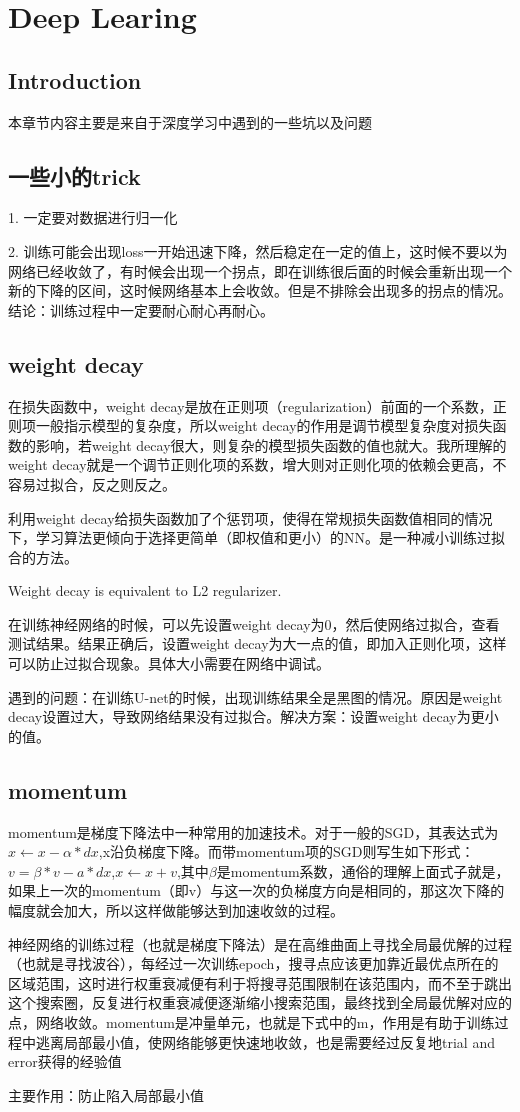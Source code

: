 \chapter{Deep Learing}

\section*{Introduction}
	本章节内容主要是来自于深度学习中遇到的一些坑以及问题
	
\section{一些小的trick}

1. 一定要对数据进行归一化

2. 训练可能会出现loss一开始迅速下降，然后稳定在一定的值上，这时候不要以为网络已经收敛了，有时候会出现一个拐点，即在训练很后面的时候会重新出现一个新的下降的区间，这时候网络基本上会收敛。但是不排除会出现多的拐点的情况。结论：训练过程中一定要耐心耐心再耐心。
	
\section{weight decay}
	\boldmath  %
	在损失函数中，weight decay是放在正则项（regularization）前面的一个系数，正则项一般指示模型的复杂度，所以weight decay的作用是调节模型复杂度对损失函数的影响，若weight decay很大，则复杂的模型损失函数的值也就大。我所理解的weight decay就是一个调节正则化项的系数，增大则对正则化项的依赖会更高，不容易过拟合，反之则反之。
	
	利用weight decay给损失函数加了个惩罚项，使得在常规损失函数值相同的情况下，学习算法更倾向于选择更简单（即权值和更小）的NN。是一种减小训练过拟合的方法。
	
	Weight decay is equivalent to L2 regularizer.
	
	在训练神经网络的时候，可以先设置weight decay为0，然后使网络过拟合，查看测试结果。结果正确后，设置weight decay为大一点的值，即加入正则化项，这样可以防止过拟合现象。具体大小需要在网络中调试。
	
	遇到的问题：在训练U-net的时候，出现训练结果全是黑图的情况。原因是weight decay设置过大，导致网络结果没有过拟合。解决方案：设置weight decay为更小的值。
	

\section{momentum}
	momentum是梯度下降法中一种常用的加速技术。对于一般的SGD，其表达式为$x \gets x-\alpha * dx$,x沿负梯度下降。而带momentum项的SGD则写生如下形式：$v=  \beta *v -a*dx$,$x \gets x+v$,其中$\beta$是momentum系数，通俗的理解上面式子就是，如果上一次的momentum（即v）与这一次的负梯度方向是相同的，那这次下降的幅度就会加大，所以这样做能够达到加速收敛的过程。
	
	神经网络的训练过程（也就是梯度下降法）是在高维曲面上寻找全局最优解的过程（也就是寻找波谷），每经过一次训练epoch，搜寻点应该更加靠近最优点所在的区域范围，这时进行权重衰减便有利于将搜寻范围限制在该范围内，而不至于跳出这个搜索圈，反复进行权重衰减便逐渐缩小搜索范围，最终找到全局最优解对应的点，网络收敛。momentum是冲量单元，也就是下式中的m，作用是有助于训练过程中逃离局部最小值，使网络能够更快速地收敛，也是需要经过反复地trial and error获得的经验值
	
	主要作用：防止陷入局部最小值
